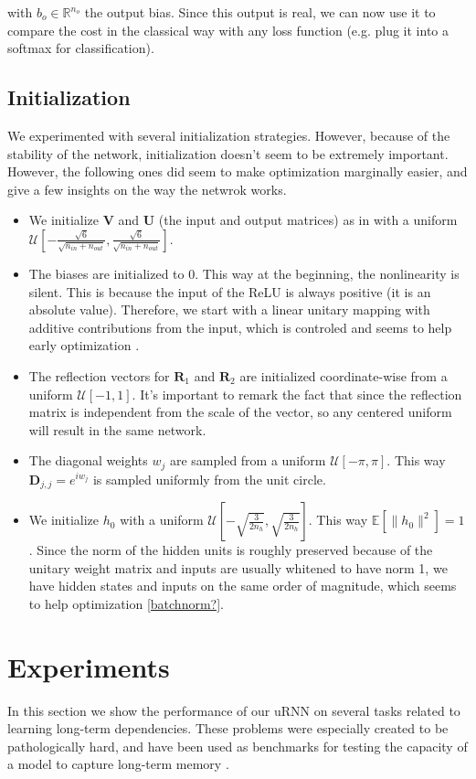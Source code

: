 \documentclass{article} %
\newcommand{\matr}[1]{\mathbf{#1}}
\newcommand\RR{\mathbb{R}}
\begin{document}
with $b_o \in \RR^{n_o}$ the output bias. Since this output is real, we can now use it to compare the cost in the classical way with any loss function (e.g. plug it into a softmax for classification).
\subsection{Initialization}

We experimented with several initialization strategies. However, because of the stability of the network, initialization doesn't seem to be extremely important. However, the following ones did seem to make optimization marginally easier, and give a few insights on the way the netwrok works.

\begin{itemize}
  \item We initialize $\matr{V}$ and $\matr{U}$ (the input and output matrices) as in \cite{Glorotinit} with a uniform $\mathcal{U}\left[-\frac{\sqrt{6}}{\sqrt{n_{in}+ n_{out}}}, \frac{\sqrt{6}}{\sqrt{n_{in}+ n_{out}}}\right]$.
  \item The biases are initialized to 0. This way at the beginning, the nonlinearity is silent. This is because the input of the ReLU is always positive (it is an absolute value). Therefore, we start with a linear unitary mapping with additive contributions from the input, which is controled and seems to help early optimization \citep{Quoc2015}.
  \item The reflection vectors for $\matr{R}_1$ and $\matr{R}_2$ are initialized coordinate-wise from a uniform $\mathcal{U}[-1, 1]$. It's important to remark the fact that since the reflection matrix is independent from the scale of the vector, so any centered uniform will result in the same network.
  \item The diagonal weights $w_j$ are sampled from a uniform $\mathcal{U}[-\pi, \pi]$. This way $\matr{D}_{j,j} = e^{i w_j}$ is sampled uniformly from the unit circle.
  \item We initialize $h_0$ with a uniform $\mathcal{U}\left[-\sqrt{\frac{3}{2n_h}}, \sqrt{\frac{3}{2n_h}} \right]$. This way $\mathbb{E}\left[\|h_0\|^2\right] = 1$. Since the norm of the hidden units is roughly preserved because of the unitary weight matrix and inputs are usually whitened to have norm 1, we have hidden states and inputs on the same order of magnitude, which seems to help optimization \ref{batchnorm?}.
\end{itemize}

\section{Experiments}
In this section we show the performance of our uRNN on several tasks related to learning long-term dependencies. These problems were especially created to be pathologically hard, and have been used as benchmarks for testing the capacity of a model to capture long-term memory \citep{LSTM} \citep{HF} \citep{Quoc2015}.
\end{document}
